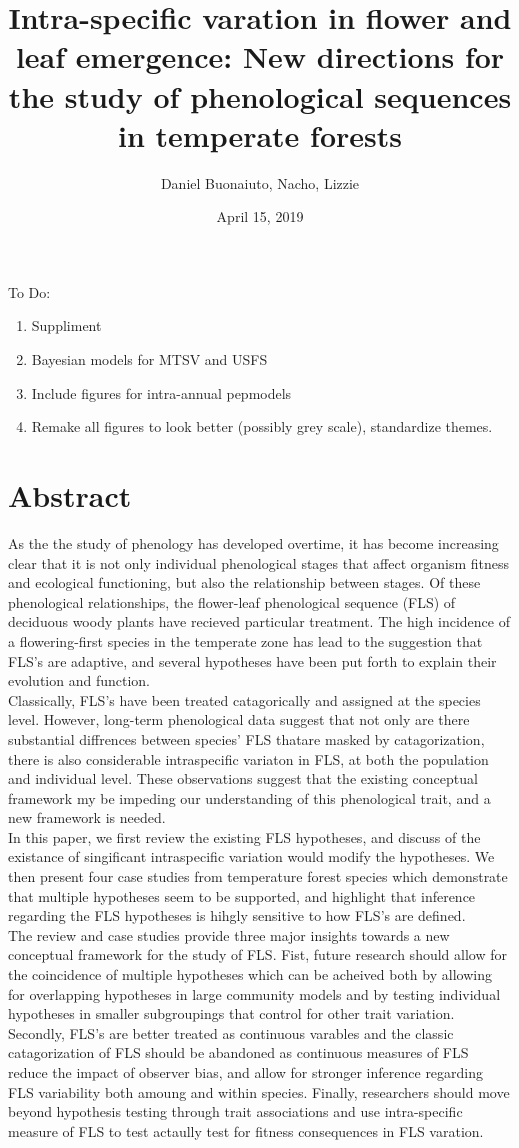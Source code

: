 \documentclass[12pt]{article}\usepackage[]{graphicx}\usepackage[]{color}
\title{Intra-specific varation in flower and leaf emergence: New directions for the study of phenological sequences in temperate forests}
\author{Daniel Buonaiuto, Nacho, Lizzie}
\date{April 15, 2019}
\begin{document}
\maketitle
To Do:
\begin{enumerate}
\item Suppliment
\item Bayesian models for MTSV and USFS
\item Include figures for intra-annual pepmodels
\item Remake all figures to look better (possibly grey scale), standardize themes. 
\end{enumerate}
\section*{Abstract}

\indent\indent As the the study of phenology has developed overtime, it has become increasing clear that it is not only individual phenological stages that affect organism fitness and ecological functioning, but also the relationship between stages. Of these phenological relationships, the flower-leaf phenological sequence (FLS) of deciduous woody plants have recieved particular treatment. The high incidence of a  flowering-first species in the temperate zone has lead to the suggestion that FLS's are adaptive, and several hypotheses have been put forth to explain their evolution and function. \\
\indent Classically, FLS's have been treated catagorically and assigned at the species level. However, long-term phenological data suggest that not only are there substantial diffrences between species' FLS thatare masked by catagorization, there is also considerable intraspecific variaton in FLS, at both the population and individual level. These observations suggest that the existing conceptual framework my be impeding our understanding of this phenological trait, and a new framework is needed.\\
 In this paper, we first review the existing FLS hypotheses, and discuss of the existance of singificant intraspecific variation would modify the hypotheses. We then present four case studies from temperature forest species which demonstrate that multiple hypotheses seem to be supported, and highlight that inference regarding the FLS hypotheses is hihgly sensitive to how FLS's are defined.\\
\indent The review and case studies provide three major insights towards a new conceptual framework for the study of FLS. Fist, future research should allow for the coincidence of multiple hypotheses which can be acheived both by allowing for overlapping hypotheses in large community models and by testing individual hypotheses in smaller subgroupings that control for other trait variation.
Secondly, FLS's are better treated as continuous varables and the classic catagorization of FLS should be abandoned as continuous measures of FLS reduce the impact of observer bias, and allow for stronger inference regarding FLS variability both amoung and within species. Finally, researchers should move beyond hypothesis testing through trait associations and use intra-specific measure of FLS to test actaully test for fitness consequences in FLS varation.
\end{document}
